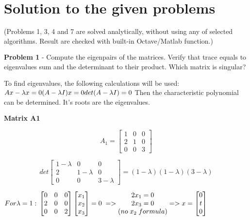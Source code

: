 \documentclass[eng,openany]{mgr}
\author{Jaroslaw M. Szumega}
\title{}
\date{20.03.2017}
\begin{document}
\maketitle

\newpage

\chapter{Solution to the given problems}
(Problems 1, 3, 4 and 7 are solved analytically, without using any of selected algorithms. Result are checked with built-in Octave/Matlab function.)

\textbf{Problem 1} - Compute the eigenpairs of the matrices. Verify that trace equals to eigenvalues sum and the determinant to their product. Which matrix is singular?

To find eigenvalues, the following calculations will be used:\\
\begin{math}
Ax - \lambda x = 0 \\
(A - \lambda I) x = 0 \\
det(A - \lambda I) = 0
\end{math}
Then the characteristic polynomial can be determined. It's roots are the eigenvalues.

\textbf{Matrix A1}

\[
A_1 =
\begin{bmatrix}
1 & 0 & 0  \\
2 & 1 & 0 \\
0 & 0 & 3 
\end{bmatrix}
\]

\[
det
\begin{bmatrix}
1 -\lambda & 0 & 0  \\
2 & 1-\lambda & 0 \\
0 & 0 & 3-\lambda 
\end{bmatrix}
=(1-\lambda)(1-\lambda)(3-\lambda)
\]

\begin{math}
For \lambda = 1:\\
\begin{bmatrix}
0 & 0 & 0  \\
2 & 0 & 0 \\
0 & 0 & 2 
\end{bmatrix}
\begin{bmatrix}
x_1 \\
x_2 \\
x_3
\end{bmatrix}
= 0\; =>
\begin{matrix}
2x_1 = 0\\
2x_3 = 0\\
(no\;x_2\;formula)
\end{matrix}
=>
x = 
\begin{bmatrix}
0\\
t \\
0
\end{bmatrix}
\end{math}
\end{document}
